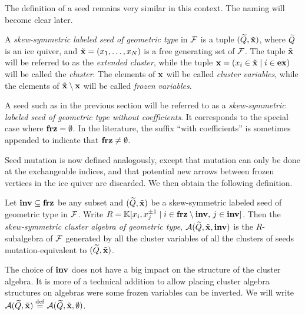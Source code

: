 The definition of a seed remains very similar in this context. The naming will become
clear later.
\begin{definition}

	A \emph{skew-symmetric labeled seed of geometric type} in $\mathcal{F}$ is a tuple $(\widetilde{Q}, \tilde{\mathbf{x}})$, where $\widetilde{Q}$ is an ice quiver, and
	$\tilde{\mathbf{x}} = (x_1, \dots, x_N)$ is a free generating set of $\mathcal{F}$. The tuple $\tilde{\mathbf{x}}$ will be
	referred to as the \emph{extended cluster}, while the tuple
	$\mathbf{x} = (x_i \in \tilde{\mathbf{x}} \mid i \in \mathbf{ex})$ will be called the \emph{cluster}. The elements
	of $\mathbf{x}$ will be called \emph{cluster variables}, while the
	elements of $\tilde{\mathbf{x}} \setminus \mathbf{x}$ will be called \emph{frozen variables}.
\end{definition}

A seed such as in the previous section will be referred to as a \emph{skew-symmetric
	labeled seed of geometric type without coefficients}. It corresponds to the special
case where $\mathbf{frz} = \emptyset$. In the literature, the suffix ``with coefficients'' is
sometimes appended to indicate that $\mathbf{frz} \neq \emptyset$.

Seed mutation is now defined analogously, except that mutation can only be done at the
exchangeable indices, and that potential new arrows between frozen vertices in the ice
quiver are discarded. We then obtain the following definition.
\begin{definition}

	Let $\mathbf{inv} \subseteq \mathbf{frz}$ be any subset and $(\widetilde{Q}, \tilde{\mathbf{x}})$ be a skew-symmetric labeled
	seed of geometric type in $\mathcal{F}$. Write $R = \mathbb{K}[x_i, x_j^{\pm 1} \mid i \in \mathbf{frz}
		\setminus \mathbf{inv},\, j \in \mathbf{inv}]$. Then the \emph{skew-symmetric cluster algebra of
		geometric type}, $\mathcal{A}(\widetilde{Q},
		\tilde{\mathbf{x}}, \mathbf{inv})$ is the $R$-subalgebra of
	$\mathcal{F}$ generated by all the cluster variables of all the clusters of seeds
	mutation-equivalent to $(\widetilde{Q}, \tilde{\mathbf{x}})$.
\end{definition}

\begin{remark}

	The choice of $\mathbf{inv}$ does not have a big impact on the structure of the cluster
	algebra. It is more of a technical addition to allow placing cluster algebra structures
	on algebras were some frozen variables can be inverted. We will write $\mathcal{A}(\widetilde{Q},
		\tilde{\mathbf{x}}) \overset{\mathrm{def}}{=} \mathcal{A}(\widetilde{Q}, \tilde{\mathbf{x}}, \emptyset)$.
\end{remark}


